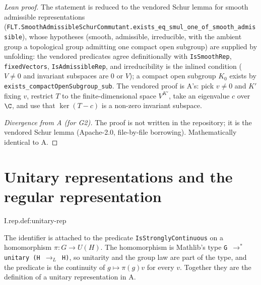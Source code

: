 \begin{proof}[Lean proof]
The statement is reduced to the vendored Schur lemma for smooth admissible representations (\texttt{FLT.SmoothAdmissibleSchurCommutant.exists\_eq\_smul\_one\_of\_smooth\_admissible}), whose hypotheses (smooth, admissible, irreducible, with the ambient group a topological group admitting one compact open subgroup) are supplied by unfolding: the vendored predicates agree definitionally with \texttt{IsSmoothRep}, \texttt{fixedVectors}, \texttt{IsAdmissibleRep}, and irreducibility is the inlined condition ($V\neq0$ and invariant subspaces are $0$ or $V$); a compact open subgroup $K_0$ exists by \texttt{exists\_compactOpenSubgroup\_sub}. The vendored proof is A's: pick $v\neq0$ and $K'$ fixing $v$, restrict $T$ to the finite-dimensional space $V^{K'}$, take an eigenvalue $c$ over $\C$, and use that $\ker(T-c)$ is a non-zero invariant subspace.

\emph{Divergence from A (for G2).} The proof is not written in the repository; it is the vendored Schur lemma (Apache-2.0, file-by-file borrowing). Mathematically identical to A.
\end{proof}


\section{Unitary representations and the regular representation}
\begin{definition}
\end{definition}
\begin{tfformal}{I.rep.def:unitary-rep}
\begin{tffidelity}
The identifier is attached to the predicate \texttt{IsStronglyContinuous} on a homomorphism $\pi\colon G\to U(H)$. The homomorphism is Mathlib's type \texttt{G $\to^*$ unitary (H $\to_L$ H)}, so unitarity and the group law are part of the type, and the predicate is the continuity of $g\mapsto\pi(g)v$ for every $v$. Together they are the definition of a unitary representation in A.
\end{tffidelity}
\end{tfformal}

